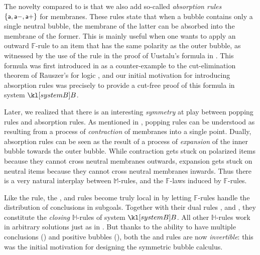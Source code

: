 \begin{description}
  The novelty compared to  is that we also add so-called
  \emph{absorption rules} $\{\text{\small$\mathsf{a}$},\text{\small$\mathsf{a{-}}$},\text{\small$\mathsf{a{+}}$}\}$ for membranes.
  These rules state that when a bubble contains only a single neutral bubble,
  the membrane of the latter can be absorbed into the membrane of the former.
  This is mainly useful when one wants to apply an outward $\mathbb{F}$-rule to
  an item that has the same polarity as the outer bubble, as witnessed by the
  use of the  rule in the proof of Uustalu's formula in
  . This formula was first introduced in
   as a counter-example to the cut-elimination
  theorem of Rauszer's  for  logic
  , and our initial motivation for
  introducing absorption rules was precisely to provide a cut-free proof of this
  formula in system $\sysB$.

  Later, we realized that there is an interesting \emph{symmetry} at play
  between popping rules and absorption rules. As mentioned in
  , popping rules can be understood as resulting from a
  process of \emph{contraction} of membranes into a single point. Dually,
  absorption rules can be seen as the result of a process of \emph{expansion} of
  the inner bubble towards the outer bubble. While contraction gets stuck on
  polarized items because they cannot cross neutral membranes outwards,
  expansion gets stuck on neutral items because they cannot cross neutral
  membranes inwards. Thus there is a very natural interplay between
  $\mathbb{M}$-rules, and the $\mathbb{F}$-laws induced by $\mathbb{F}$-rules.

  \item[\textbf{\heating}] 
  Like the  rule, the \rsf{\bot{-}}, \rsf{\lor{-}} and
  \rsf{{\limp}{-}} rules become truly local in  by letting
  $\mathbb{F}$-rules handle the distribution of conclusions in subgoals.
  Together with their dual rules \rsf{\top{+}}, \rsf{\land{+}} and
  \rsf{{\limp}{+}}, they constitute the \emph{closing} $\mathbb{H}$-rules of
  system $\sysB$. All other $\mathbb{H}$-rules work in arbitrary solutions just
  as in . But thanks to the ability to have multiple conclusions
  () and positive bubbles (), both the
  \rsf{\lor{+}} and \rsf{{\limp}{+}} rules are now \emph{invertible}: this was
  the initial motivation for designing the symmetric bubble calculus.
\end{description}